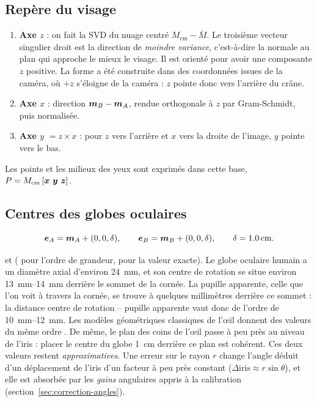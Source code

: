 \subsection{Repère du visage}
\label{sec:repere-visage}

\begin{enumerate}
  \item \textbf{Axe $z$} : on fait la SVD du nuage centré $M_\text{cm} - \bar M$. Le troisième vecteur singulier droit est la direction de \emph{moindre variance}, c'est-à-dire la normale au plan qui approche le mieux le visage. Il est orienté pour avoir une composante $z$ positive. La forme a été construite dans des coordonnées issues de la caméra, où $+z$ s'éloigne de la caméra : $z$ pointe donc vers l'arrière du crâne.
  \item \textbf{Axe $x$} : direction $\bm{m}_B - \bm{m}_A$, rendue orthogonale à $z$ par Gram-Schmidt, puis normalisée.
  \item \textbf{Axe $y$} $= z \times x$ : pour $z$ vers l'arrière et $x$ vers la droite de l'image, $y$ pointe vers le bas.
\end{enumerate}
Les points et les milieux des yeux sont exprimés dans cette base, $P = M_\text{cm}\,[\vect{x}\ \vect{y}\ \vect{z}]$.

\subsection{Centres des globes oculaires}

\begin{equation}
  \bm{e}_A = \bm{m}_A + (0, 0, \delta), \qquad \bm{e}_B = \bm{m}_B + (0, 0, \delta), \qquad \delta = \qty{1.0}{\centi\metre}.
\end{equation}

\begin{origine}
 et  (\litt{} pour l'ordre de grandeur, \empi{} pour la valeur exacte). Le globe oculaire humain a un diamètre axial d'environ \qty{24}{\milli\metre}, et son centre de rotation se situe environ \qtyrange{13}{14}{\milli\metre} derrière le sommet de la cornée. La pupille apparente, celle que l'on voit à travers la cornée, se trouve à quelques millimètres derrière ce sommet : la distance centre de rotation -- pupille apparente vaut donc de l'ordre de \qtyrange{10}{12}{\milli\metre}. Les modèles géométriques classiques de l'œil donnent des valeurs du même ordre \cite{guestrin2006,hansen2010}. De même, le plan des coins de l'œil passe à peu près au niveau de l'iris : placer le centre du globe \qty{1}{\centi\metre} derrière ce plan est cohérent. Ces deux valeurs restent \emph{approximatives}. Une erreur sur le rayon $r$ change l'angle déduit d'un déplacement de l'iris d'un facteur à peu près constant ($\Delta\text{iris} \approx r \sin\theta$), et elle est absorbée par les \emph{gains} angulaires appris à la calibration (section~\ref{sec:correction-angles}).
\end{origine}

